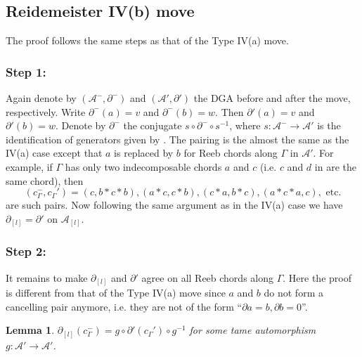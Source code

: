 \documentclass[11pt]{amsart}
\theoremstyle{mystyle}
\newtheorem{lemma}[lemma]{Lemma}
\newcommand{\<}{\langle}
\renewcommand{\>}{\rangle}
\begin{document}
\subsection{Reidemeister IV(b) move} \text{ }

The proof follows the same steps as that of the Type IV(a) move.

\subsubsection*{Step 1:} Again denote by $(\mathcal{A}^-, \partial^-)$ and $(\mathcal{A}', \partial')$ the DGA before and after the move, respectively. Write $\partial^-(a) = v$ and $\partial^-(b) = w$. Then $\partial'(a) = v$ and $\partial'(b) = w$. Denote by $\partial^-$ the conjugate $s \circ \partial^- \circ s^{-1}$, where $s: \mathcal{A}^- \rightarrow \mathcal{A}'$ is the identification of generators given by . The pairing is the almost the same as the IV(a) case except that $a$ is replaced by $b$ for Reeb chords along $\Gamma$ in $\mathcal{A}'$. For example, if $\Gamma$ has only two indecomposable chords $a$ and $c$ (i.e. $c$ and $d$ in  are the same chord), then \[(c_\Gamma^-, c_\Gamma') = (c, b * c * b), (a * c, c * b), (c * a, b * c), (a * c * a, c),\text{ etc.}\] are such pairs. Now following the same argument as in the IV(a) case we have $\partial_{[l]} = \partial'$ on $\mathcal{A}_{[l]}$.

\subsubsection*{Step 2:}  It remains to make $\partial_{[l]}$ and $\partial'$ agree on all Reeb chords along $\Gamma$. Here the proof is different from that of the Type IV(a) move since $a$ and $b$ do not form a cancelling pair anymore, i.e. they are not of the form ``$\partial a = b, \partial b = 0$''.

\begin{lemma}
    $\partial_{[l]}(c_\Gamma^-) = g \circ \partial'(c_\Gamma') \circ g^{-1}$ for some tame automorphism $g: \mathcal{A}' \rightarrow \mathcal{A}'$.
\end{lemma}
\end{document}

